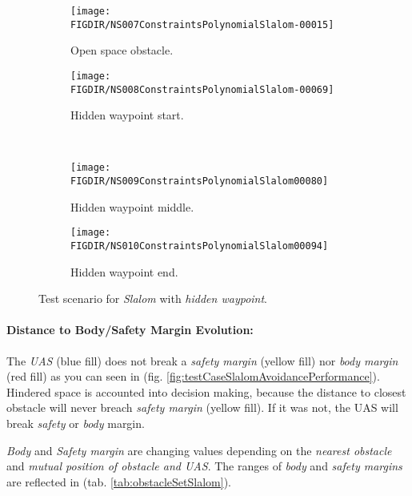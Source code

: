 \begin{figure}[H]
    \centering
    \begin{subfigure}{0.48\textwidth}
    	\centering
        \texttt{[image: \\FIGDIR/NS007ConstraintsPolynomialSlalom-00015]}
        \caption{Open space obstacle.}
        \label{fig:slalomOpenSpaceObstacle}
    \end{subfigure}
    \begin{subfigure}{0.48\textwidth}
    	\centering
        \texttt{[image: \\FIGDIR/NS008ConstraintsPolynomialSlalom-00069]} 
        \caption{Hidden waypoint start.}
        \label{fig:slalomHiddenWaypointStart}
    \end{subfigure}
    \\
    \begin{subfigure}{0.48\textwidth}
	    \centering
        \texttt{[image: \\FIGDIR/NS009ConstraintsPolynomialSlalom00080]} 
        \caption{Hidden waypoint middle.}
        \label{fig:slalomHiddenWaypointMiddle}
    \end{subfigure}
    \begin{subfigure}{0.48\textwidth}
    	\centering
        \texttt{[image: \\FIGDIR/NS010ConstraintsPolynomialSlalom00094]} 
        \caption{Hidden waypoint end.}
        \label{fig:slalomHiddenWaypointEnd}
    \end{subfigure}
    \caption{Test scenario for \emph{Slalom} with \emph{hidden waypoint}. }
    \label{fig:testCaseSlalomwithHiddenWaypoint}
\end{figure}


\paragraph{Distance to Body/Safety Margin Evolution:} The \emph{UAS} (blue fill) does not break a \emph{safety margin} (yellow fill) nor \emph{body margin} (red fill) as you can seen in (fig. \ref{fig:testCaseSlalomAvoidancePerformance}). Hindered space is accounted into decision making, because the distance to closest obstacle will never breach \emph{safety margin} (yellow fill). If it was not, the UAS will break \emph{safety} or \emph{body} margin. 

\emph{Body} and \emph{Safety margin} are changing values depending on the \emph{nearest obstacle} and \emph{mutual position of obstacle and UAS}. The ranges of \emph{body} and \emph{safety margins} are reflected in (tab. \ref{tab:obstacleSetSlalom}). 

